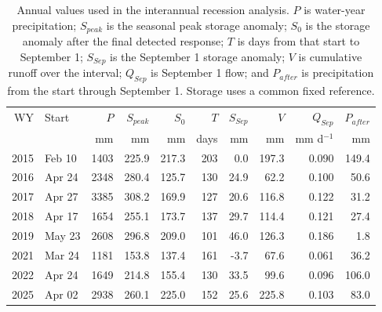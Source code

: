 \begin{table}[htbp]
\centering
\caption{Annual values used in the interannual recession analysis. $P$ is water-year precipitation; $S_{peak}$ is the seasonal peak storage anomaly; $S_0$ is the storage anomaly after the final detected response; $T$ is days from that start to September 1; $S_{Sep}$ is the September 1 storage anomaly; $V$ is cumulative runoff over the interval; $Q_{Sep}$ is September 1 flow; and $P_{after}$ is precipitation from the start through September 1. Storage uses a common fixed reference.}
\label{tab:annual_recession}
\small
\setlength{\tabcolsep}{4pt}
\begin{tabular}{rlrrrrrrrr}
\hline
WY & Start & $P$ & $S_{peak}$ & $S_0$ & $T$ & $S_{Sep}$ & $V$ & $Q_{Sep}$ & $P_{after}$ \\
 & & mm & mm & mm & days & mm & mm & mm d$^{-1}$ & mm \\
\hline
2015 & Feb 10 & 1403 & 225.9 & 217.3 & 203 & 0.0 & 197.3 & 0.090 & 149.4 \\
2016 & Apr 24 & 2348 & 280.4 & 125.7 & 130 & 24.9 & 62.2 & 0.100 & 50.6 \\
2017 & Apr 27 & 3385 & 308.2 & 169.9 & 127 & 20.6 & 116.8 & 0.122 & 31.2 \\
2018 & Apr 17 & 1654 & 255.1 & 173.7 & 137 & 29.7 & 114.4 & 0.121 & 27.4 \\
2019 & May 23 & 2608 & 296.8 & 209.0 & 101 & 46.0 & 126.3 & 0.186 & 1.8 \\
2021 & Mar 24 & 1181 & 153.8 & 137.4 & 161 & -3.7 & 67.6 & 0.061 & 36.2 \\
2022 & Apr 24 & 1649 & 214.8 & 155.4 & 130 & 33.5 & 99.6 & 0.096 & 106.0 \\
2025 & Apr 02 & 2938 & 260.1 & 225.0 & 152 & 25.6 & 225.8 & 0.103 & 83.0 \\
\hline
\end{tabular}
\end{table}
